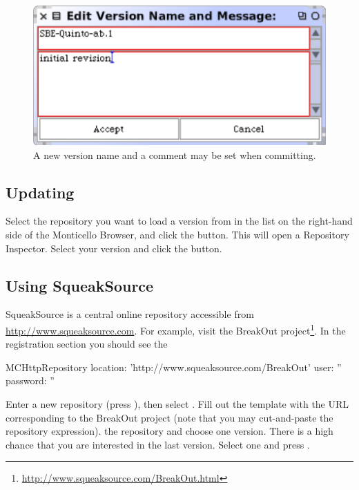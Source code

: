 \documentclass[a4paper,10pt,twoside]{book}
\begin{document}
\begin{figure}[ht]\centering
	\includegraphics[width=.55\linewidth]{saving.png}
	\caption{A new version name and a comment may be set when committing.}
\end{figure}

\subsection{Updating}

Select the repository you want to load a version from in the list on the right-hand side of the Monticello Browser, and click the  button. This will open a Repository Inspector. Select your version and click the  button.


\subsection{Using SqueakSource}

SqueakSource is a central online repository accessible from \url{http://www.squeaksource.com}. For example, visit the BreakOut project\footnote{\url{http://www.squeaksource.com/BreakOut.html}}. In the registration section you should see the 

\begin{code}{}
MCHttpRepository
    location: 'http://www.squeaksource.com/BreakOut'
    user: ''
    password: ''
\end{code}

Enter a new repository (press ), then select . Fill out the template with the URL corresponding to the BreakOut project (note that you may cut-and-paste the repository expression).
 the repository and choose one version. There is a high chance that you are interested in the last version. Select one and press .
\end{document}
